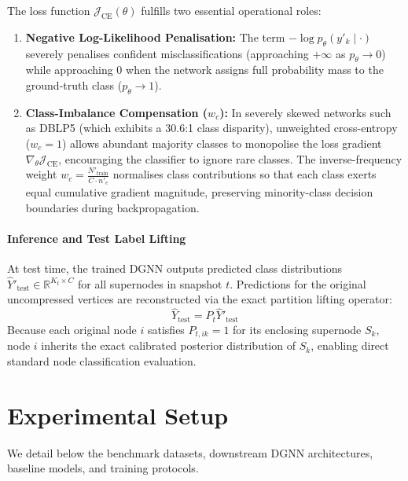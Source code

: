 \documentclass[sigconf]{acmart}
\begin{document}
The loss function $\mathcal{J}_{\text{CE}}(\theta)$ fulfills two essential operational roles:
\begin{enumerate}
    \item \textbf{Negative Log-Likelihood Penalisation:} The term $-\log p_\theta(y'_k \mid \cdot)$ severely penalises confident misclassifications (approaching $+\infty$ as $p_\theta \to 0$) while approaching $0$ when the network assigns full probability mass to the ground-truth class ($p_\theta \to 1$).
    \item \textbf{Class-Imbalance Compensation ($w_c$):} In severely skewed networks such as DBLP5 (which exhibits a 30.6:1 class disparity), unweighted cross-entropy ($w_c = 1$) allows abundant majority classes to monopolise the loss gradient $\nabla_\theta \mathcal{J}_{\text{CE}}$, encouraging the classifier to ignore rare classes. The inverse-frequency weight $w_c = \frac{N'_{\text{train}}}{C \cdot n'_c}$ normalises class contributions so that each class exerts equal cumulative gradient magnitude, preserving minority-class decision boundaries during backpropagation.
\end{enumerate}

\paragraph{Inference and Test Label Lifting}
At test time, the trained DGNN outputs predicted class distributions $\widehat{Y}'_{\text{test}} \in \mathbb{R}^{K_t \times C}$ for all supernodes in snapshot $t$. Predictions for the original uncompressed vertices are reconstructed via the exact partition lifting operator:
\[
\widehat{Y}_{\text{test}} = P_t \widehat{Y}'_{\text{test}}
\]
Because each original node $i$ satisfies $P_{t, ik} = 1$ for its enclosing supernode $S_k$, node $i$ inherits the exact calibrated posterior distribution of $S_k$, enabling direct standard node classification evaluation.

\section{Experimental Setup}
\label{sec:experiments}
We detail below the benchmark datasets, downstream DGNN architectures, baseline models, and training protocols.
\end{document}
